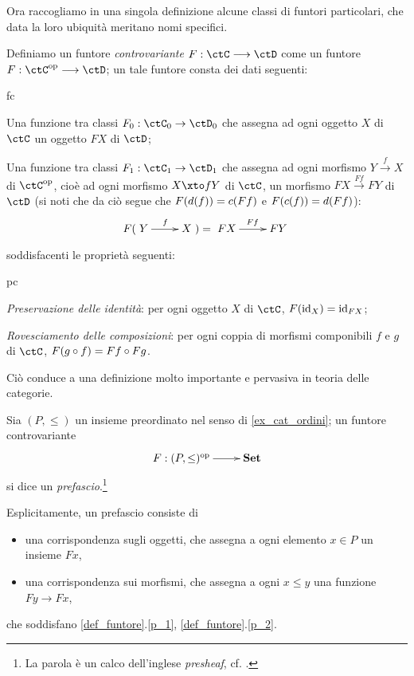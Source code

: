 Ora raccogliamo in una singola definizione alcune classi di funtori particolari, che data la loro ubiquità meritano nomi specifici.
\begin{definition}\label{def_funtore_contro}
	Definiamo un funtore \emph{controvariante} \(F : \ctC \fun\ctD\) come un funtore \(F : \ctC^\op\fun\ctD\); un tale funtore consta dei dati seguenti:
	\begin{enumtag}{fc}
		\item \label{fc_1} Una funzione tra classi \(F_0 : \ctC_0\to\ctD_0\) che assegna ad ogni oggetto \(X\) di \(\ctC\) un oggetto \(FX\) di \(\ctD\);
		\item \label{fc_2} Una funzione tra classi \(F_1 : \ctC_1\to\ctD_1\) che assegna ad ogni morfismo \(Y \xrightarrow{f} X\) di \(\ctC^\op\), cioè ad ogni morfismo \(X\xto f Y\) di \(\ctC\), un morfismo \(FX \xrightarrow{Ff} FY\) di \(\ctD\) (si noti che da ciò segue che \(F(d(f))=c(Ff)\) e \(F(c(f))=d(Ff)\)):
		\[F(\xymatrix{Y \ar[r]^f & X}) = \xymatrix{FX \ar[r]^{Ff} & FY}\]
	\end{enumtag}
	soddisfacenti le proprietà seguenti:
	\begin{enumtag}{pc}
		\item \label{pc_1} \emph{Preservazione delle identità}: per ogni oggetto \(X\) di \(\ctC\), \(F(\mathrm{id}_X)=\mathrm{id}_{FX}\);
		\item \label{pc_2} \emph{Rovesciamento delle composizioni}: per ogni coppia di morfismi componibili \(f\) e \(g\) di \(\ctC\), \(F(g\circ f)=Ff\circ Fg\).
	\end{enumtag}
\end{definition}
Ciò conduce a una definizione molto importante e pervasiva in teoria delle categorie.
\begin{definition}\label{exa_funtori_da_poset}
	Sia \((P,\le)\) un insieme preordinato nel senso di \ref{ex_cat_ordini}; un funtore controvariante
	\[\xymatrix{F : (P,\le)^\op \ar[r] & \ctSet}\]
	si dice un \emph{prefascio}.\footnote{La parola è un calco dell'inglese \emph{presheaf}, cf. \cite{a,b,c}.}

	Esplicitamente, un prefascio consiste di
	\begin{itemize}
		\item una corrispondenza sugli oggetti, che assegna a ogni elemento \(x\in P\) un insieme \(Fx\),
		\item una corrispondenza sui morfismi, che assegna a ogni \(x\le y\) una funzione \(Fy\to Fx\),
	\end{itemize}
	che soddisfano \ref{def_funtore}.\ref{p_1}, \ref{def_funtore}.\ref{p_2}.
\end{definition}
